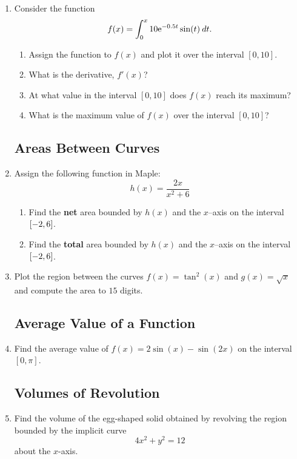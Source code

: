 \begin{enumerate}
\item Consider the function \[ f(x) = \displaystyle\int_{0}^{x} 10 {\rm e}^{-0.5 t} \sin(t) \: dt. \]
	\begin{enumerate}
	\item Assign the function to $f(x)$ and plot it over the interval $[0,10]$.
	\item What is the derivative, $f'(x)$?
	\item At what value in the interval $[0,10]$ does $f(x)$ reach its maximum?
	\item What is the maximum value of $f(x)$ over the interval $[0,10]$?
	\end{enumerate}

\subsection{Areas Between Curves}

\item Assign the following function in Maple: $$h(x) = \dfrac{2x}{x^2+6}$$
	\begin{enumerate}
	\item Find the \textbf{net} area bounded by $h(x)$ and the $x$--axis on the interval $\left[-2,6\right]$.
	\item Find the \textbf{total} area bounded by $h(x)$ and the $x$--axis on the interval $\left[-2,6\right]$.
	\end{enumerate}

\item Plot the region between the curves $f(x) = \tan^2(x)$ and $g(x) = \sqrt{x}$ and compute the area to $15$ digits.

\subsection{Average Value of a Function}

\item Find the average value of $f(x) = 2\sin(x) - \sin(2x)$ on the interval $[0,\pi]$.
	
\subsection{Volumes of Revolution}

\item Find the volume of the egg-shaped solid obtained by revolving the region bounded by the implicit curve \[ 4x^2 + y^2 = 12 \] about the $x$-axis.


\end{enumerate}
